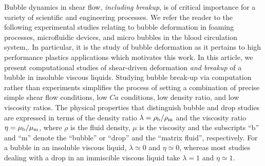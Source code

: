 \documentclass[%
 reprint,
 showkeys,
 amsmath,amssymb,
 aps,
 prfluids,
 onecolumn
]{revtex4-2}
\begin{document}
Bubble dynamics in shear flow, {\em including breakup},
is of critical importance for a
variety of scientific and engineering processes. We refer the reader to the
following experimental studies relating to bubble deformation in foaming
processes, microfluidic devices, and micro bubbles in the blood circulation
system,\cite{ChuFinBouAtaHamPug19,MulTobDreFisWin08,BenRodFauPinFerPerGarMirLim18,DreSai15}.
In particular, it is the study of bubble deformation as it pertains to high
performance plastics applications which motivates this work.  In this article,
we present computational studies of shear-driven deformation 
{\em and breakup} of a
bubble in insoluble viscous liquids.  Studying bubble break-up via computation
rather than experiments simplifies the process of setting a combination of
precise simple shear flow conditions, low $Ca$ conditions, low density ratio,
and low viscosity ratios.  The physical properties that distinguish bubble and
drop studies are expressed in terms of the density ratio $\lambda = \rho_{\rm
b} / \rho_{\rm m}$ and the viscosity ratio $\eta = \mu_{\rm b} / \mu_{\rm m}$,
where $\rho$ is the fluid density, $\mu$ is the viscosity and the subscripts
``b'' and ``m'' denote the ``bubble'' or ``drop'' and the ``matrix fluid'',
respectively.  For a bubble in an insoluble viscous liquid, $\lambda \simeq 0$
and $\eta \simeq 0$, whereas most studies dealing with a drop in an immiscible
viscous liquid take $\lambda =1$ and $\eta \simeq 1$.  
\end{document}
